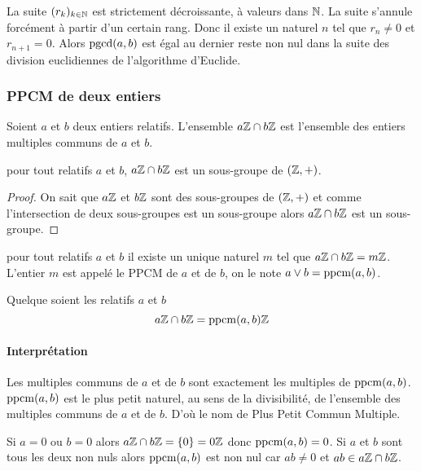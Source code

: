La suite \((r_k)_{k \in \mathbb{N}}\) est strictement décroissante, à valeurs dans
\(\mathbb{N}\). La suite s'annule forcément à partir d'un certain rang. Donc il existe
un naturel \(n\) tel que \(r_n \neq 0\) et \(r_{n+1}=0\). Alors \(\operatorname{pgcd}(a,b)\)
est égal au dernier reste non nul dans la suite des division euclidiennes de
l'algorithme d'Euclide.

\subsubsection{PPCM de deux entiers}

Soient \(a\) et \(b\) deux entiers relatifs. L'ensemble \(a\mathbb{Z} \cap b\mathbb{Z}\) est
l'ensemble des entiers multiples communs de \(a\) et \(b\).
\begin{theo}
  pour tout relatifs \(a\) et \(b\), \(a\mathbb{Z} \cap b\mathbb{Z}\) est un sous-groupe de
  \((\mathbb{Z},+)\).
\end{theo}
\begin{proof}
  On sait que \(a\mathbb{Z}\) et \(b\mathbb{Z}\) sont des sous-groupes de \((\mathbb{Z},+)\) et comme
  l'intersection de deux sous-groupes est un sous-groupe alors \(a\mathbb{Z} \cap b\mathbb{Z}\)
  est un sous-groupe.
\end{proof}
\begin{corth}
  pour tout relatifs \(a\) et \(b\) il existe un unique naturel \(m\) tel que
  \(a\mathbb{Z} \cap b\mathbb{Z}= m \mathbb{Z}\). L'entier \(m\) est appelé le PPCM de \(a\) et de
  \(b\), on le note \(a \vee b = \operatorname{ppcm}(a,b)\).
\end{corth}
\begin{theo}
  Quelque soient les relatifs \(a\) et \(b\)
  \begin{equation}
    a\mathbb{Z} \cap b\mathbb{Z} = \operatorname{ppcm}(a,b) \mathbb{Z}
  \end{equation}
\end{theo}

\paragraph{Interprétation}

Les multiples communs de \(a\) et de \(b\) sont exactement les multiples de
\(\operatorname{ppcm}(a,b)\). \(\operatorname{ppcm}(a,b)\) est le plus petit naturel, au sens de la
divisibilité, de l'ensemble des multiples communs de \(a\) et de \(b\). D'où le
nom de Plus Petit Commun Multiple.

Si \(a=0\) ou \(b=0\) alors \(a\mathbb{Z} \cap b\mathbb{Z} = \{0\}=0\mathbb{Z}\) donc \(\operatorname{ppcm}(a,b)=0\).
Si \(a\) et \(b\) sont tous les deux non nuls alors \(\operatorname{ppcm}(a,b)\) est non nul
car \(ab \neq 0\) et \(ab \in a\mathbb{Z} \cap b\mathbb{Z}\).

